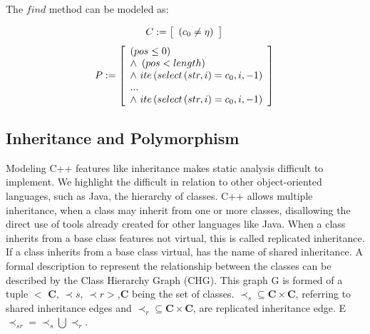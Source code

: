 \documentclass[a4paper]{llncs}
\begin{document}
The $find$ method can be modeled as:

\begin{equation}
\label{cfind-string}
C := \left [ \begin{array}{ll}
                \left(c_{0} \neq \eta\right)\\
              \end{array} \right ]  \\
\end{equation}
%
\begin{equation}
\label{pfind-string}
P := \left [ \begin{array}{ll}
	       \left(pos \leq 0\right)\\
               \wedge \, \, \left(pos < length\right)\\
               \wedge \, \, ite\left(select\left(str, i\right) = c_{0}, i, -1\right)\\
	       ...\\
	       \wedge \, \, ite\left(select\left(str, i\right) = c_{0}, i, -1\right)\\
              \end{array} \right ]  \\
\end{equation}

\subsection{Inheritance and Polymorphism}

Modeling C++ features like inheritance makes static analysis difficult to implement. We highlight the difficult in relation to other
object-oriented languages, such as Java, the hierarchy of classes. C++ allows multiple inheritance, when a class may inherit from
one or more classes, disallowing the direct use of tools already created for other languages like Java.
When a class inherits from a base class features not virtual, this is called replicated inheritance. If a class inherits from a base
class virtual, has the name of shared inheritance.
A formal description to represent the relationship between the classes can be described by the Class Hierarchy Graph (CHG).
This graph G is formed of a tuple $<$ \textbf{C},  $\prec s$, $\prec r >$,\textbf{C} being the set of classes. $
\prec_s \subseteq \textbf{C} \times \textbf{C}$, referring to shared inheritance edges and $\prec_r \subseteq
\textbf{C} \times \textbf{C}$, are replicated inheritance edge. E $\prec_{sr} = \prec_s \bigcup \prec_r$.
\end{document}
